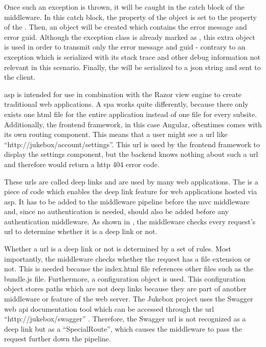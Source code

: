 Once such an exception is thrown, it will be caught in the catch block of the middleware. In this catch block, the  property of the  object is set to the  property of the . Then, an  object will be created which contains the error message and error \gls{guid}. Although the exception class is already marked as \lstcode{[Serializable]}, this extra object is used in order to transmit only the error message and \gls{guid} - contrary to an exception which is serialized with its stack trace and other debug information not relevant in this scenario. Finally, the  will be serialized to a \gls{json} string and sent to the client.





\gls{asp} is intended for use in combination with the Razor view engine to create traditional web applications. A \gls{spa} works quite differently, because there only exists one \gls{html} file for the entire application instead of one file for every subsite. Additionally, the frontend framework, in this case Angular, oftentimes comes with its own routing component. This means that a user might see a \gls{url} like \enquote{http://jukebox/account/settings}. This \gls{url} is used by the frontend framework to display the settings component, but the backend knows nothing about such a \gls{url} and therefore would return a \gls{http} 404 error code.

These \glspl{url} are called deep links and are used by many web applications. The  is a piece of code which enables the deep link feature for web applications hosted via \gls{asp}. It has to be added to the middleware pipeline before the \gls{mvc} middleware and, since no authentication is needed, should also be added before any authentication middleware. As shown in , the middleware checks every request's \gls{url} to determine whether it is a deep link or not.

Whether a \gls{url} is a deep link or not is determined by a set of rules. Most importantly, the middleware checks whether the request has a file extension or not. This is needed because the index.html file references other files such as the bundle.js file. Furthermore, a configuration object is used. This configuration object stores paths which are not deep links because they are part of another middleware or feature of the web server. The Jukebox project uses the Swagger web \gls{api} documentation tool which can be accessed through the \gls{url} \enquote{http://jukebox/swagger} \cite{swagger}. Therefore, the Swagger \gls{url} is not recognized as a deep link but as a \enquote{SpecialRoute}, which causes the middleware to pass the request further down the pipeline.

